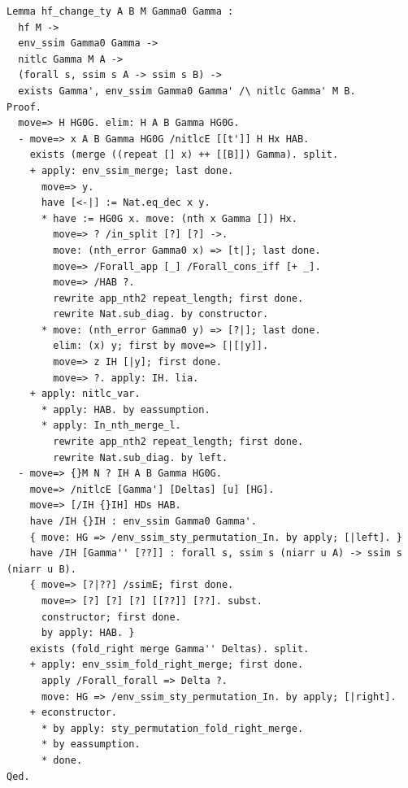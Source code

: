 \documentclass[10pt,a4paper]{article}
\begin{document}
\begin{lstlisting}[style=authorcoq]
Lemma hf_change_ty A B M Gamma0 Gamma :
  hf M ->
  env_ssim Gamma0 Gamma ->
  nitlc Gamma M A ->
  (forall s, ssim s A -> ssim s B) ->
  exists Gamma', env_ssim Gamma0 Gamma' /\ nitlc Gamma' M B.
Proof.
  move=> H HG0G. elim: H A B Gamma HG0G.
  - move=> x A B Gamma HG0G /nitlcE [[t']] H Hx HAB.
    exists (merge ((repeat [] x) ++ [[B]]) Gamma). split.
    + apply: env_ssim_merge; last done.
      move=> y.
      have [<-|] := Nat.eq_dec x y.
      * have := HG0G x. move: (nth x Gamma []) Hx.
        move=> ? /in_split [?] [?] ->.
        move: (nth_error Gamma0 x) => [t|]; last done.
        move=> /Forall_app [_] /Forall_cons_iff [+ _].
        move=> /HAB ?.
        rewrite app_nth2 repeat_length; first done.
        rewrite Nat.sub_diag. by constructor.
      * move: (nth_error Gamma0 y) => [?|]; last done.
        elim: (x) y; first by move=> [|[|y]].
        move=> z IH [|y]; first done.
        move=> ?. apply: IH. lia.
    + apply: nitlc_var.
      * apply: HAB. by eassumption.
      * apply: In_nth_merge_l.
        rewrite app_nth2 repeat_length; first done.
        rewrite Nat.sub_diag. by left.
  - move=> {}M N ? IH A B Gamma HG0G.
    move=> /nitlcE [Gamma'] [Deltas] [u] [HG].
    move=> [/IH {}IH] HDs HAB.
    have /IH {}IH : env_ssim Gamma0 Gamma'.
    { move: HG => /env_ssim_sty_permutation_In. by apply; [|left]. }
    have /IH [Gamma'' [??]] : forall s, ssim s (niarr u A) -> ssim s (niarr u B).
    { move=> [?|??] /ssimE; first done.
      move=> [?] [?] [?] [[??]] [??]. subst.
      constructor; first done.
      by apply: HAB. }
    exists (fold_right merge Gamma'' Deltas). split.
    + apply: env_ssim_fold_right_merge; first done.
      apply /Forall_forall => Delta ?.
      move: HG => /env_ssim_sty_permutation_In. by apply; [|right].
    + econstructor.
      * by apply: sty_permutation_fold_right_merge.
      * by eassumption.
      * done.
Qed.


\end{lstlisting}
\end{document}
